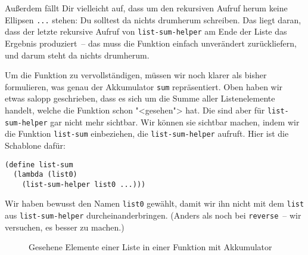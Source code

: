 Außerdem fällt Dir vielleicht auf, dass um den rekursiven Aufruf herum
keine Ellipsen \lstinline{...} stehen: Du solltest da nichts drumherum
schreiben.  Das liegt daran, dass der letzte rekursive Aufruf von
\lstinline{list-sum-helper} am Ende der Liste das Ergebnis
produziert~-- das muss die Funktion einfach unverändert zurückliefern,
und darum steht da nichts drumherum.

Um die Funktion zu vervollständigen, müssen wir noch klarer als bisher
formulieren, was genau der Akkumulator \lstinline{sum} repräsentiert.
Oben haben wir etwas salopp geschrieben, dass es sich um die Summe
aller Listenelemente handelt, welche die Funktion schon "<gesehen">
hat.  Die sind aber für \lstinline{list-sum-helper} gar nicht mehr
sichtbar.  Wir können sie sichtbar machen, indem wir die Funktion
\lstinline{list-sum} einbeziehen, die \lstinline{list-sum-helper}
aufruft.  Hier ist die Schablone dafür:
%
\begin{lstlisting}
(define list-sum
  (lambda (list0)
    (list-sum-helper list0 ...)))
\end{lstlisting}
%
Wir haben bewusst den Namen \lstinline{list0} gewählt, damit wir ihn
nicht mit dem \lstinline{list} aus \lstinline{list-sum-helper}
durcheinanderbringen.  (Anders als noch bei \lstinline{reverse}~-- wir
versuchen, es besser zu machen.)

\begin{figure}[tb]
  \centering
  
  \caption{Gesehene Elemente einer Liste in einer Funktion mit Akkumulator}
  \label{fig:list0-list}
\end{figure}

